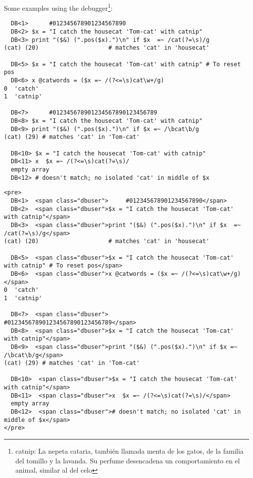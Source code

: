 \begin{it}
Some examples using the debugger\footnote{catnip: 
La nepeta cataria, también llamada menta de los gatos, de la familia del tomillo y la lavanda. 
Su perfume desencadena un comportamiento en el animal, similar al del celo}:

\begin{latexonly}
\begin{verbatim}
  DB<1>      #012345678901234567890
  DB<2> $x = "I catch the housecat 'Tom-cat' with catnip"
  DB<3> print "($&) (".pos($x).")\n" if $x  =~ /cat(?=\s)/g
(cat) (20)                    # matches 'cat' in 'housecat'

  DB<5> $x = "I catch the housecat 'Tom-cat' with catnip" # To reset pos
  DB<6> x @catwords = ($x =~ /(?<=\s)cat\w+/g)
0  'catch'
1  'catnip'

  DB<7>      #012345678901234567890123456789
  DB<8> $x = "I catch the housecat 'Tom-cat' with catnip"
  DB<9> print "($&) (".pos($x).")\n" if $x =~ /\bcat\b/g
(cat) (29) # matches 'cat' in 'Tom-cat'

  DB<10> $x = "I catch the housecat 'Tom-cat' with catnip"
  DB<11> x  $x =~ /(?<=\s)cat(?=\s)/
  empty array
  DB<12> # doesn't match; no isolated 'cat' in middle of $x
\end{verbatim}
\end{latexonly}
\begin{verbatim}
<pre>
  DB<1>  <span class="dbuser">     #012345678901234567890</span>
  DB<2>  <span class="dbuser">$x = "I catch the housecat 'Tom-cat' with catnip"</span>
  DB<3>  <span class="dbuser">print "($&) (".pos($x).")\n" if $x  =~ /cat(?=\s)/g</span>
(cat) (20)                    # matches 'cat' in 'housecat'

  DB<5>  <span class="dbuser">$x = "I catch the housecat 'Tom-cat' with catnip" # To reset pos</span>
  DB<6>  <span class="dbuser">x @catwords = ($x =~ /(?<=\s)cat\w+/g)</span>
0  'catch'
1  'catnip'

  DB<7>  <span class="dbuser">     #012345678901234567890123456789</span>
  DB<8>  <span class="dbuser">$x = "I catch the housecat 'Tom-cat' with catnip"</span>
  DB<9>  <span class="dbuser">print "($&) (".pos($x).")\n" if $x =~ /\bcat\b/g</span>
(cat) (29) # matches 'cat' in 'Tom-cat'

  DB<10>  <span class="dbuser">$x = "I catch the housecat 'Tom-cat' with catnip"</span>
  DB<11>  <span class="dbuser">x  $x =~ /(?<=\s)cat(?=\s)/</span>
  empty array
  DB<12>  <span class="dbuser"># doesn't match; no isolated 'cat' in middle of $x</span>
</pre>
\end{verbatim}


\end{it}
